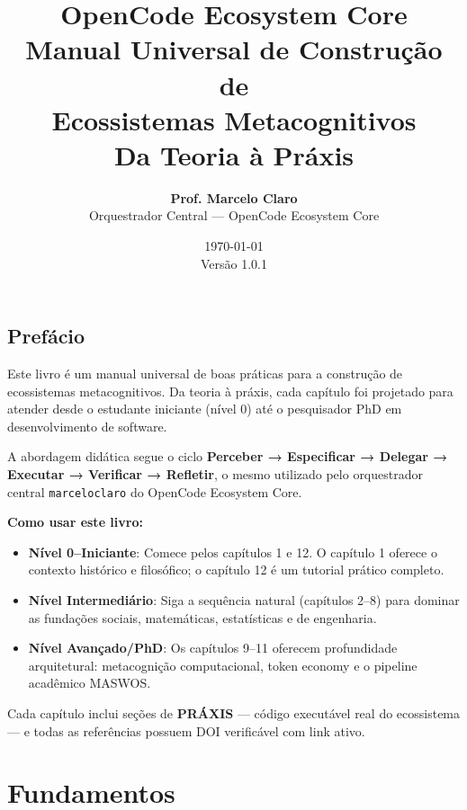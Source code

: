 \documentclass[12pt,a4paper,oneside]{book}
\title{%
    \textbf{OpenCode Ecosystem Core} \\
    \large Manual Universal de Construção de \\
    Ecossistemas Metacognitivos \\
    \vspace{0.5cm}
    \normalsize Da Teoria à Práxis
}
\author{%
    \textbf{Prof. Marcelo Claro} \\
    \vspace{0.3cm}
    \small Orquestrador Central — OpenCode Ecosystem Core
}
\date{\today \\ \vspace{0.3cm} \small Versão 1.0.1}
\begin{document}
\maketitle
\tableofcontents
\newpage

\chapter*{Prefácio}

Este livro é um manual universal de boas práticas para a construção de ecossistemas metacognitivos. Da teoria à práxis, cada capítulo foi projetado para atender desde o estudante iniciante (nível 0) até o pesquisador PhD em desenvolvimento de software.

A abordagem didática segue o ciclo \textbf{Perceber → Especificar → Delegar → Executar → Verificar → Refletir}, o mesmo utilizado pelo orquestrador central \texttt{marceloclaro} do OpenCode Ecosystem Core.

\vspace{1cm}
\noindent\textbf{Como usar este livro:}
\begin{itemize}
    \item \textbf{Nível 0--Iniciante}: Comece pelos capítulos 1 e 12. O capítulo 1 oferece o contexto histórico e filosófico; o capítulo 12 é um tutorial prático completo.
    \item \textbf{Nível Intermediário}: Siga a sequência natural (capítulos 2--8) para dominar as fundações sociais, matemáticas, estatísticas e de engenharia.
    \item \textbf{Nível Avançado/PhD}: Os capítulos 9--11 oferecem profundidade arquitetural: metacognição computacional, token economy e o pipeline acadêmico MASWOS.
\end{itemize}

Cada capítulo inclui seções de \textbf{PRÁXIS} — código executável real do ecossistema — e todas as referências possuem DOI verificável com link ativo.

\newpage


\part{Fundamentos}





\end{document}
